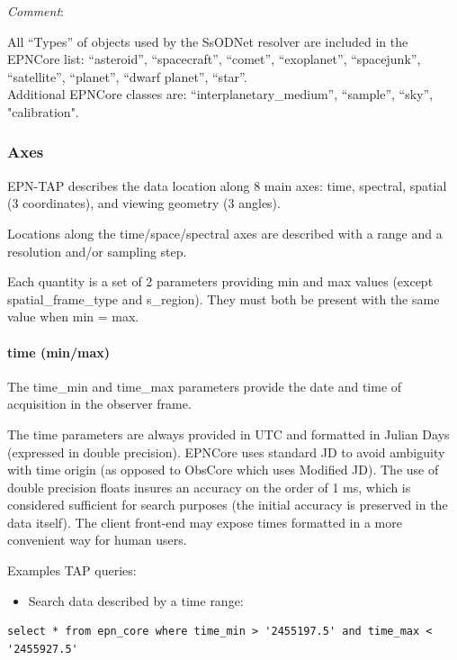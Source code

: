 \documentclass[11pt,a4paper]{ivoa}
\begin{document}
\emph{Comment}: 

All ``Types'' of objects used by the SsODNet resolver are included in the EPNCore list: ``asteroid'', ``spacecraft'', ``comet'', ``exoplanet'', ``spacejunk'', ``satellite'', ``planet'', ``dwarf planet'', ``star''.\\Additional EPNCore classes are: ``interplanetary\_medium'', ``sample'', ``sky'', "calibration".


\subsubsection{Axes}

EPN-TAP describes the data location along 8 main axes: time, spectral, spatial (3 coordinates), and viewing geometry (3 angles). 

Locations along the time/space/spectral axes are described with a range and a resolution and/or sampling step. 

Each quantity is a set of 2 parameters providing min and max values (except spatial\_frame\_type and s\_region). They must both be present with the same value when min = max.

\paragraph{time (min/max)}

The time\_min and time\_max parameters provide the date and time of acquisition in the observer frame. 

The time parameters are always provided in UTC and formatted in Julian Days (expressed in double precision). EPNCore uses standard JD to avoid ambiguity with time origin (as opposed to ObsCore which uses Modified JD). The use of double precision floats insures an accuracy on the order of 1 ms, which is considered sufficient for search purposes (the initial accuracy is preserved in the data itself).  The client front-end may expose times formatted in a more convenient way for human users.

Examples TAP queries:

\begin{itemize}
\item Search data described by a time range:
\end{itemize}

\begin{verbatim}
select * from epn_core where time_min > '2455197.5' and time_max < '2455927.5'
\end{verbatim}
\end{document}
